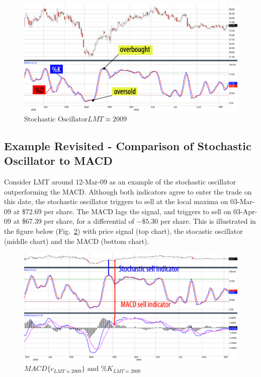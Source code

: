 \begin{figure}[ht]\centering
\label{fig:stochasticOscillator}
\includegraphics[width=1\textwidth]{figures/Stochastic-LMT-1.eps}
\caption{$\mbox{Stochastic Oscillator} LMT \approx 2009$}
\end{figure}
%
\subsection{Example Revisited - Comparison of Stochastic Oscillator to MACD}
%
Consider LMT around 12-Mar-09 as an example of the stochastic oscillator outperforming the MACD.  Although both indicators agree to enter the trade on this date, the stochastic oscillator triggers to sell at the local maxima on 03-Mar-09 at \$72.69 per share.  The MACD lags the signal, and triggers to sell on 03-Apr-09 at \$67.39 per share, for a differential of $-\$5.30$ per share.  This is illustrated in the figure below (Fig.~\ref{stochasticMACD}) with price signal (top chart), the stocastic oscillator (middle chart) and the MACD (bottom chart).
%
\begin{figure}[ht]\centering
\label{stochasticMACD}
\includegraphics[width=1\textwidth]{figures/Stochastic-MACD-LMT-1.eps}
\caption{$MACD\{c_{LMT \approx 2009}\} \mbox{ and } \%K_{LMT \approx 2009}$}
\end{figure}
%
